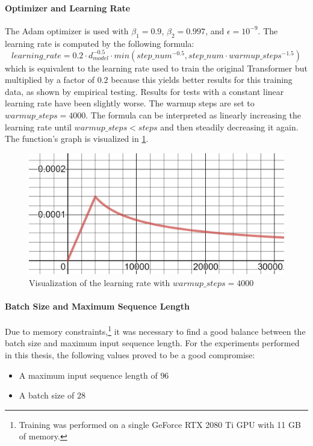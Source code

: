 \paragraph{Optimizer and Learning Rate}

The Adam optimizer \cite{article} is used with $\beta_1=0.9$, $\beta_2=0.997$, and $\epsilon = 10^{-9}$.
The learning rate is computed by the following formula:
\[
	learning\_rate = 0.2 \cdot d_{model}^{-0.5} \cdot min(step\_num^{-0.5}, step\_num \cdot warmup\_steps^{-1.5})
\]
which is equivalent to the learning rate used to train the original Transformer \cite[p.~7]{1706.03762} but multiplied by a factor of $0.2$ because this yields better results for this training data, as shown by empirical testing.
Results for tests with a constant linear learning rate have been slightly worse.
The warmup steps are set to $warmup\_steps = 4000$.
The formula can be interpreted as linearly increasing the learning rate until $warmup\_steps < steps$ and then steadily decreasing it again.
The function's graph is visualized in \cref{fig:learning-rate}.

\begin{figure}[h]
\centering
\includegraphics[width=0.6\paperwidth]{figures/learning-rate}
\caption{Visualization of the learning rate with $warmup\_steps = 4000$}
\label{fig:learning-rate}
\end{figure}

\paragraph{Batch Size and Maximum Sequence Length}

Due to memory constraints,\footnote{Training was performed on a single GeForce RTX 2080 Ti GPU with 11 GB of memory.} it was necessary to find a good balance between the batch size and maximum input sequence length.
For the experiments performed in this thesis, the following values proved to be a good compromise:
\begin{itemize}
\item A maximum input sequence length of $96$ %
\item A batch size of $28$
\end{itemize}

